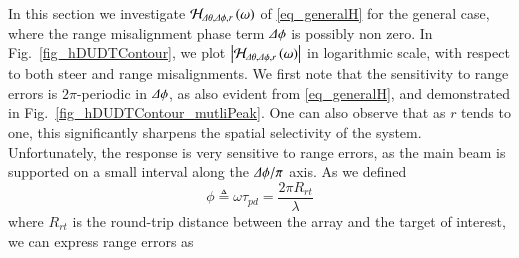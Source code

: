 \documentclass[journal]{IEEEtran}
\begin{document}
In this section we investigate $\mathcal{H}_{\Delta\theta,\Delta\phi,r}\left({\omega}\right)$ of \eqref{eq_generalH} for the general case, where the range misalignment phase term $\Delta\phi$ is possibly non zero. In Fig.~\ref{fig_hDUDTContour}, we plot $\left\vert\mathcal{H}_{\Delta\theta,\Delta\phi,r}\left({\omega}\right)\right\vert$ in logarithmic scale, with respect to both steer and range misalignments. 
We first note that the sensitivity to range errors is  $2\pi$-periodic in $\Delta\phi$, as also evident from \eqref{eq_generalH}, and demonstrated in Fig.~\ref{fig_hDUDTContour_mutliPeak}.
One can also observe that as $r$ tends to one, this significantly sharpens the spatial selectivity of the system. Unfortunately, the response is very sensitive to range errors, as the main beam is supported on a small interval along the $\Delta\phi/\pi$ axis.
As we defined
\[
\phi\triangleq\omega\tau_{pd}=\frac{2\pi R_{rt}}{\lambda}
\]
where $R_{rt}$ is the round-trip distance between the array and the target of interest, we can express range errors as
\end{document}
